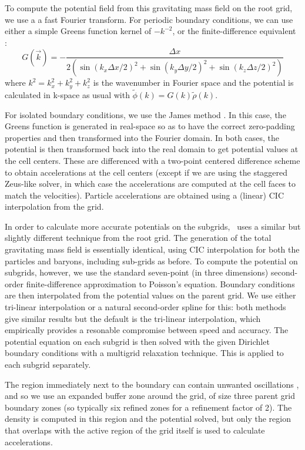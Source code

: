 To compute the potential field from this gravitating mass field on the root grid, we use a a fast Fourier transform. For periodic boundary conditions, we can use either a simple Greens function kernel of $-k^{-2}$, or the finite-difference equivalent \citep{Hockney88}:
\begin{equation}
G(\vec{k}) = - \frac{\Delta x}{2 \left( \sin(k_x \Delta x/2)^2 + \sin(k_y \Delta y/2)^2 + \sin(k_z \Delta z/2)^2 \right) }
\end{equation}
where $k^2 = k_x^2 + k_y^2 + k_z^2$ is the wavenumber in Fourier space and the potential is calculated in k-space as usual with $\tilde{\phi}(k) = G(k) \tilde{\rho}(k)$.  

For isolated boundary conditions, we use the James method \citep{James77}.  In this case, the Greens function is generated in real-space so as to have the correct zero-padding properties and then transformed into the Fourier domain.  In both cases, the potential is then transformed back into the real domain to get potential values at the cell centers.  These are differenced with a two-point centered difference scheme to obtain accelerations at the cell centers (except if we are using the staggered Zeus-like solver, in which case the accelerations are computed at the cell faces to match the velocities).  Particle accelerations are obtained using a (linear) CIC interpolation from the grid.

In order to calculate more accurate potentials on the subgrids, \enzo\ uses a similar but slightly different technique from the root grid.  The generation of the total gravitating mass field is essentially identical, using CIC interpolation for both the particles and baryons, including sub-grids as before.  To compute the potential on subgrids, however, we use the standard seven-point (in three dimensions) second-order finite-difference approximation to Poisson's equation.  Boundary conditions are then interpolated from the potential values on the parent grid.  We use either tri-linear interpolation or a natural second-order spline for this: both methods give similar results but the default is the tri-linear interpolation, which empirically provides a resonable compromise between speed and accuracy. The potential equation on each subgrid is then solved with the given Dirichlet boundary conditions with a multigrid relaxation technique.  This is applied to each subgrid separately.

The region immediately next to the boundary can contain unwanted oscillations \citep[e.g.,][]{Anninos94}, and so we use an expanded buffer zone around the grid, of size three parent grid boundary zones (so typically six refined zones for a refinement factor of 2).  The density is computed in this region and the potential solved, but only the region that overlaps with the active region of the grid itself is used to calculate accelerations.

